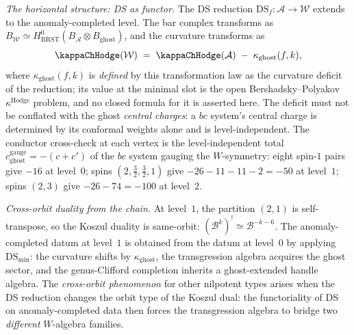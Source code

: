 \begin{construction}
\emph{The horizontal structure: DS as functor.}
The DS reduction $\mathrm{DS}_f\colon\mathcal A\to\mathcal W$
extends to the anomaly-completed level. The bar complex
transforms as
$B_{\mathcal W}\simeq H^0_{\mathrm{BRST}}(B_{\mathcal A}
\otimes B_{\mathrm{ghost}})$,
and the curvature transforms as
\begin{equation}%
\kappaChHodge(\mathcal W)
\;=\;
\kappaChHodge(\mathcal A)
\;-\;
\kappa_{\mathrm{ghost}}(f,k),
\end{equation}
where $\kappa_{\mathrm{ghost}}(f,k)$ is \emph{defined} by this
transformation law as the curvature deficit of the reduction; its
value at the minimal slot is the open Bershadsky--Polyakov
$\kappa^{\mathrm{Hodge}}$ problem, and no closed formula for it is
asserted here. The deficit must not be conflated with the ghost
\emph{central charges}: a $bc$ system's central charge is determined
by its conformal weights alone and is level-independent. The
conductor cross-check at each vertex is the level-independent total
$c^{\mathrm{gauge}}_{\mathrm{ghost}} = -(c+c')$ of the $bc$ system
gauging the $W$-symmetry: eight spin-$1$ pairs give $-16$ at
level~$0$; spins $(2, \tfrac32, \tfrac32, 1)$ give
$-26 - 11 - 11 - 2 = -50$ at level~$1$; spins $(2,3)$ give
$-26 - 74 = -100$ at level~$2$.

\emph{Cross-orbit duality from the chain.}
At level~$1$, the partition $(2,1)$ is self-transpose, so
the Koszul duality is same-orbit:
$(\mathcal B^k)^!\simeq\mathcal B^{-k-6}$. The
anomaly-completed datum at level~$1$ is obtained from the
datum at level~$0$ by applying
$\mathrm{DS}_{\min}$: the curvature shifts by
$\kappa_{\mathrm{ghost}}$, the transgression algebra
acquires the ghost sector, and the genus-Clifford completion
inherits a ghost-extended handle algebra. The
\emph{cross-orbit phenomenon} for other nilpotent types arises
when the DS reduction changes the orbit type of the Koszul
dual: the functoriality of DS on anomaly-completed data
then forces the transgression algebra to bridge two
\emph{different} $W$-algebra families.
\end{construction}

